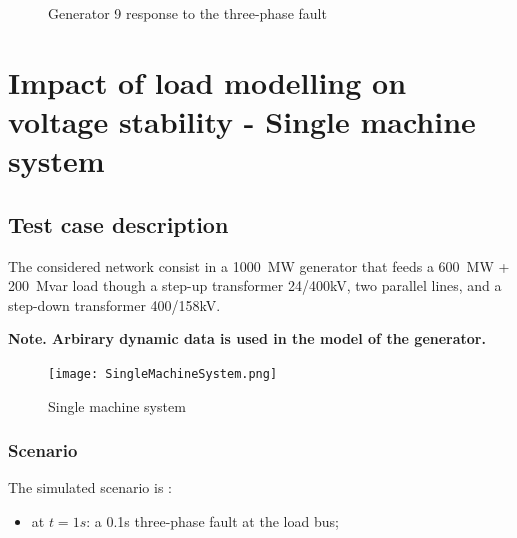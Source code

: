 \documentclass[a4paper, 12pt]{report}
\begin{document}
\begin{figure}[H]
\caption{Generator 9 response to the three-phase fault}
\end{figure}

\chapter{Impact of load modelling on voltage stability - Single machine system}

\section{Test case description}

The considered network consist in a 1000~MW generator that feeds a 600~MW + 200~Mvar load though a step-up transformer 24/400kV, two parallel lines, and a step-down transformer 400/158kV.

\textbf{Note. Arbirary dynamic data is used in the model of the generator.}

\begin{figure}[H]
  \texttt{[image: SingleMachineSystem.png]}
  \caption{Single machine system}
\end{figure}

\subsection{Scenario}
The simulated scenario is :
\begin{itemize}
\item at $t=1s$: a 0.1s three-phase fault at the load bus;
\end{itemize}
\end{document}
